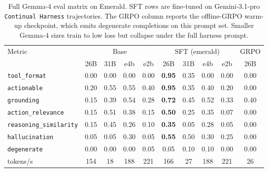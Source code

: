 \documentclass[11pt]{article}
\begin{document}
\begin{table}[t]
\centering
\scriptsize
\setlength{\tabcolsep}{3pt}
\caption{Full Gemma-4 eval matrix on Emerald. SFT rows are fine-tuned on Gemini-3.1-pro \texttt{Continual Harness} trajectories. The GRPO column reports the offline-GRPO warm-up checkpoint, which emits degenerate completions on this prompt set. Smaller Gemma-4 sizes train to low loss but collapse under the full harness prompt.}
\label{tab:h6_eval_full_emerald}
\begin{tabular}{lccccccccc}
\toprule
Metric & \multicolumn{4}{c}{Base} & \multicolumn{4}{c}{SFT (emerald)} & GRPO \\
\cmidrule(lr){2-5} \cmidrule(lr){6-9} \cmidrule(lr){10-10}
       & 26B & 31B & e4b & e2b & 26B & 31B & e4b & e2b & 26B \\
\midrule
\texttt{tool\_format}          & 0.00 & 0.00 & 0.00 & 0.00 & \textbf{0.95} & 0.35 & 0.00 & 0.00 & 0.00 \\
\texttt{actionable}            & 0.20 & 0.55 & 0.55 & 0.40 & \textbf{0.95} & 0.35 & 0.40 & 0.20 & 0.00 \\
\texttt{grounding}             & 0.15 & 0.39 & 0.54 & 0.28 & \textbf{0.72} & 0.45 & 0.52 & 0.33 & 0.40 \\
\texttt{action\_relevance}     & 0.15 & 0.51 & 0.38 & 0.15 & \textbf{0.50} & 0.25 & 0.35 & 0.07 & 0.00 \\
\texttt{reasoning\_similarity} & 0.15 & 0.45 & 0.26 & 0.10 & \textbf{0.35} & 0.05 & 0.28 & 0.05 & 0.00 \\
\texttt{hallucination}         & 0.05 & 0.05 & 0.30 & 0.05 & \textbf{0.55} & 0.50 & 0.30 & 0.25 & 0.00 \\
\texttt{degenerate}            & 0.00 & 0.00 & 0.00 & 0.05 & 0.05 & 0.10 & 0.10 & 0.00 & 0.00 \\
tokens/s                       & 154 & 18 & 188 & 221 & 166 & 27 & 188 & 221 & 26 \\
\bottomrule
\end{tabular}
\end{table}
\end{document}
